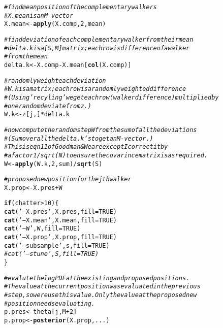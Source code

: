 \documentclass{article}\usepackage[]{graphicx}\usepackage[]{color}
\makeatletter
\newcommand{\hlnum}[1]{\textcolor[rgb]{0.686,0.059,0.569}{#1}}%
\newcommand{\hlstr}[1]{\textcolor[rgb]{0.192,0.494,0.8}{#1}}%
\newcommand{\hlcom}[1]{\textcolor[rgb]{0.678,0.584,0.686}{\textit{#1}}}%
\newcommand{\hlopt}[1]{\textcolor[rgb]{0,0,0}{#1}}%
\newcommand{\hlstd}[1]{\textcolor[rgb]{0.345,0.345,0.345}{#1}}%
\newcommand{\hlkwa}[1]{\textcolor[rgb]{0.161,0.373,0.58}{\textbf{#1}}}%
\newcommand{\hlkwb}[1]{\textcolor[rgb]{0.69,0.353,0.396}{#1}}%
\newcommand{\hlkwc}[1]{\textcolor[rgb]{0.333,0.667,0.333}{#1}}%
\newcommand{\hlkwd}[1]{\textcolor[rgb]{0.737,0.353,0.396}{\textbf{#1}}}%
\newenvironment{kframe}{%
 \def\at@end@of@kframe{}%
 \ifinner\ifhmode%
  \def\at@end@of@kframe{\end{minipage}}%
  \begin{minipage}{\columnwidth}%
 \fi\fi%
 \def\FrameCommand##1{\hskip\@totalleftmargin \hskip-\fboxsep
 \colorbox{shadecolor}{##1}\hskip-\fboxsep
     \hskip-\linewidth \hskip-\@totalleftmargin \hskip\columnwidth}%
 \MakeFramed {\advance\hsize-\width
   \@totalleftmargin\z@ \linewidth\hsize
   \@setminipage}}%
 {\par\unskip\endMakeFramed%
 \at@end@of@kframe}
\newenvironment{knitrout}{}{} %
\makeatother
\begin{document}
\begin{knitrout}
\begin{kframe}
\begin{alltt}
    \hlcom{# find mean position of the complementary walkers}
    \hlcom{# X.mean is an M-vector}
    \hlstd{X.mean} \hlkwb{<-} \hlkwd{apply}\hlstd{(X.comp,} \hlnum{2}\hlstd{, mean)}

    \hlcom{# find deviation of each complementary walker from their mean}
    \hlcom{# delta.k is a [S, M] matrix; each row is difference of a walker }
    \hlcom{# from the mean}
    \hlstd{delta.k} \hlkwb{<-} \hlstd{X.comp} \hlopt{-} \hlstd{X.mean[}\hlkwd{col}\hlstd{(X.comp)]}

    \hlcom{# randomly weight each deviation}
    \hlcom{# W.k is a matrix; each row is a randomly weighted difference}
    \hlcom{# (Using 'recyling' we get each row (walker difference) multiplied by}
    \hlcom{# one random deviate from z.)}
    \hlstd{W.k} \hlkwb{<-} \hlstd{z[j, ]} \hlopt{*} \hlstd{delta.k}

    \hlcom{# now compute the random step W from the sum of all the deviations}
    \hlcom{# (Sum over all the delta.k's to get an M-vector.)}
    \hlcom{# This is eqn 11 of Goodman & Weare except I correct it by }
    \hlcom{# a factor 1/sqrt(N) to ensure the covarince matrix is as required.}
    \hlstd{W} \hlkwb{<-} \hlkwd{apply}\hlstd{(W.k,} \hlnum{2}\hlstd{, sum)} \hlopt{/} \hlkwd{sqrt}\hlstd{(S)}

    \hlcom{# proposed new position for the jth walker}
    \hlstd{X.prop} \hlkwb{<-} \hlstd{X.pres} \hlopt{+} \hlstd{W}

    \hlkwa{if} \hlstd{(chatter} \hlopt{>} \hlnum{10}\hlstd{) \{}
      \hlkwd{cat}\hlstd{(}\hlstr{'-- X.pres'}\hlstd{, X.pres,} \hlkwc{fill}\hlstd{=}\hlnum{TRUE}\hlstd{)}
      \hlkwd{cat}\hlstd{(}\hlstr{'-- X.mean'}\hlstd{, X.mean,} \hlkwc{fill}\hlstd{=}\hlnum{TRUE}\hlstd{)}
      \hlkwd{cat}\hlstd{(}\hlstr{'-- W'}\hlstd{, W,} \hlkwc{fill}\hlstd{=}\hlnum{TRUE}\hlstd{)}
      \hlkwd{cat}\hlstd{(}\hlstr{'-- X.prop'}\hlstd{, X.prop,} \hlkwc{fill}\hlstd{=}\hlnum{TRUE}\hlstd{)}
      \hlkwd{cat}\hlstd{(}\hlstr{'-- subsample'}\hlstd{, s,} \hlkwc{fill}\hlstd{=}\hlnum{TRUE}\hlstd{)}
\hlcom{#      cat('-- stune', S, fill=TRUE)}
    \hlstd{\}}

    \hlcom{# evalute the log PDF at the existing and proposed positions.}
    \hlcom{# The value at the current position was evaluated in the previous}
    \hlcom{# step, so we reuse this value. Only the value at the proposed new}
    \hlcom{# position needs evaluating.}
    \hlstd{p.pres} \hlkwb{<-} \hlstd{theta[j, M}\hlopt{+}\hlnum{2}\hlstd{]}
    \hlstd{p.prop} \hlkwb{<-} \hlkwd{posterior}\hlstd{(X.prop, ...)}


\end{alltt}
\end{kframe}
\end{knitrout}
\end{document}
